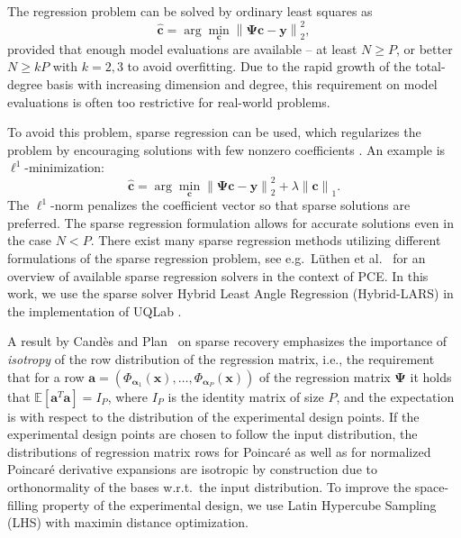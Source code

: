 \documentclass[a4paper,11pt]{article}
\newcommand{\ve}[1]{\boldsymbol{#1}}
\newcommand{\Esp}[1]{{\mathbb E}\left[ #1 \right]}
\newcommand{\norme}[2]{\left\| #1 \right\|_{#2}}
\newcommand{\alp}{{\ve{\alpha}}}
\renewcommand{\citep}[2][]{\cite[#1]{#2}}
\theoremstyle{definition}
\theoremstyle{remark}
\theoremstyle{theorem}
\begin{document}
The regression problem can be solved by ordinary least squares as
\begin{equation}
\label{eq:OLS}
\hat{\ve c} = \arg\min_{\ve c} \norme{\ve\Psi \ve c - \ve y}{2}^2,
\end{equation}
provided that enough model evaluations are available -- at least $N \geq P$, or better $N \geq kP$ with $k = 2,3$ to avoid overfitting. 
Due to the rapid growth of the total-degree basis with increasing dimension and degree, this requirement on model evaluations is often too restrictive for real-world problems. 

To avoid this problem, sparse regression can be used, which regularizes the problem by encouraging solutions with few nonzero coefficients \citep{Candes2008a, Kougioumtzoglou2020}. An example is $\ell^1$-minimization:
\begin{equation}
\label{eq:ex_l1min}
\hat{\ve c} = \arg\min_{\ve c} \norme{\ve\Psi \ve c - \ve y}{2}^2 + \lambda \norme{\ve c}{1}.
\end{equation}
The $\ell^1$-norm penalizes the coefficient vector so that sparse solutions are preferred.
The sparse regression formulation 
allows for accurate solutions even in the case $N < P$. There exist many sparse regression methods utilizing different formulations of the sparse regression problem, see e.g.\ L\"uthen et al.~\cite{LuethenSIAMJUQ2020} for an overview of available sparse regression solvers in the context of PCE.
In this work, we use the sparse solver Hybrid Least Angle Regression (Hybrid-LARS) \citep{Efron2004, blasud11} in the implementation of UQLab \citep{MarelliUQLab2014,UQdocPCE}.

A result by Cand\`es and Plan~\cite{Candes2011} on sparse recovery emphasizes the importance of \textit{isotropy} of the row distribution of the regression matrix, i.e., the requirement that for a row $\ve a = (\Phi_{\alp_1}(\ve x), \ldots, \Phi_{\alp_P}(\ve x))$ of the regression matrix $\ve\Psi$ it holds that $\Esp{\ve a^T \ve a} = I_P$, where $I_P$ is the identity matrix of size $P$, and the expectation is with respect to the distribution of the experimental design points. If the experimental design points are chosen to follow the input distribution, the distributions of regression matrix rows for Poincar\'e as well as for normalized Poincar\'e derivative expansions are isotropic by construction due to orthonormality of the bases w.r.t.\ the input distribution. 
To improve the space-filling property of the experimental design, we use Latin Hypercube Sampling (LHS) \citep{McKay1979} with maximin distance optimization.
\end{document}
